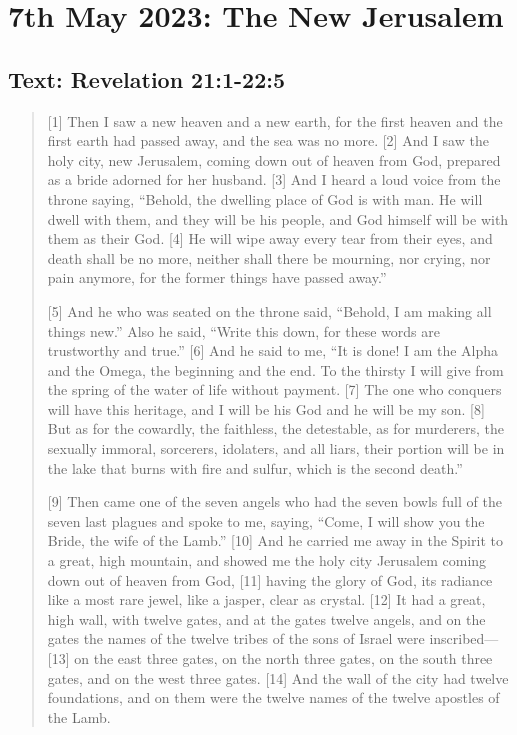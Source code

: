 \setcounter{figure}{0}

\section{7th May 2023: The New Jerusalem}
\subsection*{Text: Revelation 21:1-22:5}
  \begin{quote}
    [1] Then I saw a new heaven and a new earth, for the first heaven and the
    first earth had passed away, and the sea was no more. [2] And I saw the
    holy city, new Jerusalem, coming down out of heaven from God, prepared as
    a bride adorned for her husband. [3] And I heard a loud voice from the
    throne saying, “Behold, the dwelling place of God is with man. He will
    dwell with them, and they will be his people, and God himself will be
    with them as their God. [4] He will wipe away every tear from their eyes,
    and death shall be no more, neither shall there be mourning, nor crying,
    nor pain anymore, for the former things have passed away.”

    [5] And he who was seated on the throne said, “Behold, I am making all
    things new.” Also he said, “Write this down, for these words are
    trustworthy and true.” [6] And he said to me, “It is done! I am the Alpha
    and the Omega, the beginning and the end. To the thirsty I will give from
    the spring of the water of life without payment. [7] The one who conquers
    will have this heritage, and I will be his God and he will be my son. [8]
    But as for the cowardly, the faithless, the detestable, as for murderers,
    the sexually immoral, sorcerers, idolaters, and all liars, their portion
    will be in the lake that burns with fire and sulfur, which is the second
    death.”

    [9] Then came one of the seven angels who had the seven bowls full of the
    seven last plagues and spoke to me, saying, “Come, I will show you the
    Bride, the wife of the Lamb.” [10] And he carried me away in the Spirit
    to a great, high mountain, and showed me the holy city Jerusalem coming
    down out of heaven from God, [11] having the glory of God, its radiance
    like a most rare jewel, like a jasper, clear as crystal. [12] It had a
    great, high wall, with twelve gates, and at the gates twelve angels, and
    on the gates the names of the twelve tribes of the sons of Israel were
    inscribed—[13] on the east three gates, on the north three gates, on the
    south three gates, and on the west three gates. [14] And the wall of the
    city had twelve foundations, and on them were the twelve names of the
    twelve apostles of the Lamb.


\end{quote}
